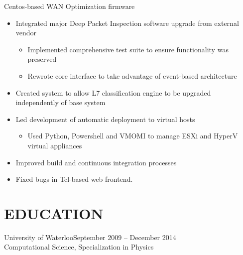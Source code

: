 \documentclass{res}
\begin{document}
\begin{resume}
         Centos-based WAN Optimization firmware
         \begin{itemize}
         \item Integrated major Deep Packet Inspection software upgrade from external vendor
           \begin{itemize}
           \item Implemented comprehensive test suite to ensure functionality was preserved
           \item Rewrote core interface to take advantage of event-based architecture
           \end{itemize}
         \item Created system to allow L7 classification engine to be upgraded independently of base system
         \item Led development of automatic deployment to virtual hosts
           \begin{itemize}
           \item Used Python, Powershell and VMOMI to manage ESXi and HyperV virtual appliances
           \end{itemize}
         \item Improved build and continuous integration processes
         \item Fixed bugs in Tcl-based web frontend.
         \end{itemize}

%
%

\section{EDUCATION}
  \vspace{3mm}
    University of Waterloo\hfill September 2009 -- December 2014\\
    Computational Science, Specialization in Physics
    \vspace{-3mm}
 
\end{resume}
\end{document}
